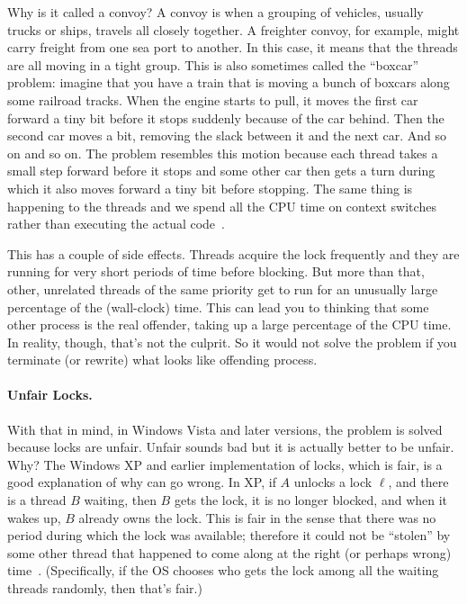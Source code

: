 \documentclass[a4paper]{report}
\begin{document}
Why is it called a convoy? A convoy is when a grouping of vehicles, usually trucks or ships, travels all closely together. A freighter convoy, for example, might carry freight from one sea port to another. In this case, it means that the threads are all moving in a tight group. This is also sometimes called the ``boxcar'' problem: imagine that you have a train that is moving a bunch of boxcars along some railroad tracks. When the engine starts to pull, it moves the first car forward a tiny bit before it stops suddenly because of the car behind. Then the second car moves a bit, removing the slack between it and the next car. And so on and so on. The problem resembles this motion because each thread takes a small step forward before it stops and some other car then gets a turn during which it also moves forward a tiny bit before stopping. The same thing is happening to the threads and we spend all the CPU time on context switches rather than executing the actual code~\cite{boxcar}.

This has a couple of side effects. Threads acquire the lock frequently and they are running for very short periods of time before blocking. But more than that, other, unrelated threads of the same priority get to run for an unusually large percentage of the (wall-clock) time. This can lead you to thinking that some other process is the real offender, taking up a large percentage of the CPU time. In reality, though, that's not the culprit. So it would not solve the problem if you terminate (or rewrite) what looks like offending process. 

\paragraph{Unfair Locks.} With that in mind, in Windows Vista and later versions, the problem is solved because locks are unfair. Unfair sounds bad but it is actually better to be unfair. Why? The Windows XP and earlier implementation of locks, which is fair, is a good explanation of why can go wrong. In XP, if $A$ unlocks a lock $\ell$, and there is a thread $B$ waiting, then $B$ gets the lock, it is no longer blocked, and when it wakes up, $B$ already owns the lock. This is fair in the sense that there was no period during which the lock was available; therefore it could not be ``stolen'' by some other thread that happened to come along at the right (or perhaps wrong) time~\cite{anticonvoy}. (Specifically, if the OS chooses who gets the lock among all the waiting threads randomly, then that's fair.)
\end{document}
